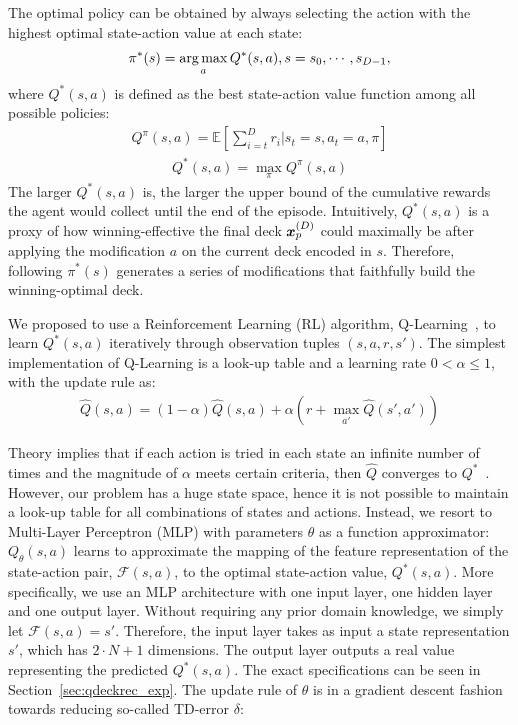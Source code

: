 The optimal policy can be obtained by always selecting the action with the highest optimal state-action value at each state:
\begin{align}
    \pi^*(s) = \operatorname*{arg\,max}_a Q^*(s,a),  s = s_0, \cdots, s_{D-1},
\label{eqn:optpolicy}
\end{align}
where $Q^*(s,a)$ is defined as the best state-action value function among all possible policies:
\begin{align}
Q^\pi(s,a)=\mathbb{E}[\sum_{i=t}^{D} r_i | s_t=s, a_t=a, \pi] 
\end{align}
\begin{align}
Q^*(s,a)=\max_\pi Q^\pi(s,a) 
\end{align}
The larger $Q^*(s,a)$ is, the larger the upper bound of the cumulative rewards the agent would collect until the end of the episode. Intuitively, $Q^*(s,a)$ is a proxy of how winning-effective the final deck $\boldsymbol{x}_p^{(D)}$ could maximally be after applying the modification $a$ on the current deck encoded in $s$. Therefore, following $\pi^*(s)$ generates a series of modifications that faithfully build the winning-optimal deck. 

We proposed to use a Reinforcement Learning (RL) algorithm, Q-Learning~\citep{watkins1992q}, to learn $Q^*(s,a)$ iteratively through observation tuples $(s,a,r,s')$. The simplest implementation of Q-Learning is a look-up table and a learning rate $0 < \alpha \leq 1$, with the update rule as: 
\begin{align}
\hat{Q}(s,a) = (1 - \alpha) \hat{Q}(s,a) + \alpha (r + \max_{a'} \hat{Q}(s', a')) 
\label{eqn:qsa}
\end{align}

Theory implies that if each action is tried in each state an infinite number of times and the magnitude of $\alpha$ meets certain criteria, then $\hat{Q}$ converges to $Q^*$~\cite{bertsekas1989parallel}. However, our problem has a huge state space, hence it is not possible to maintain a look-up table for all combinations of states and actions. Instead, we resort to Multi-Layer Perceptron (MLP) with parameters $\theta$ as a function approximator: $Q_\theta(s,a)$ learns to approximate the mapping of the feature representation of the state-action pair, $\mathcal{F}(s,a)$, to the optimal state-action value, $Q^*(s,a)$. More specifically, we use an MLP architecture with one input layer, one hidden layer and one output layer. Without requiring any prior domain knowledge, we simply let $\mathcal{F}(s,a)=s'$. Therefore, the input layer takes as input a state representation $s'$, which has ${2\cdot N+1}$ dimensions. The output layer outputs a real value  representing the predicted $Q^*(s,a)$. The exact specifications can be seen in Section~\ref{sec:qdeckrec_exp}. The update rule of $\theta$ is in a gradient descent fashion towards reducing so-called TD-error $\delta$:


